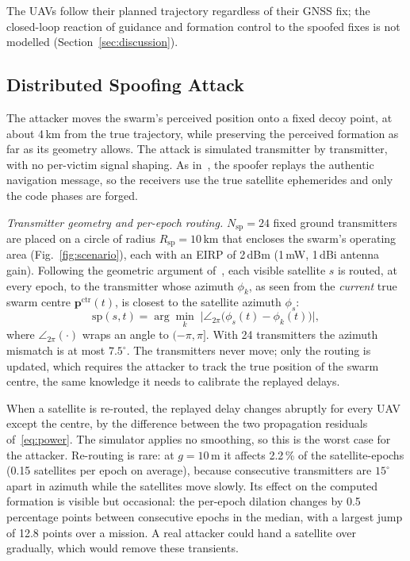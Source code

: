 \documentclass[conference]{IEEEtran}
\begin{document}
The UAVs follow their planned trajectory regardless of their GNSS fix;
the closed-loop reaction of guidance and formation control to the spoofed
fixes is not modelled (Section~\ref{sec:discussion}).

\subsection{Distributed Spoofing Attack}
\label{sec:attack}

The attacker moves the swarm's perceived position onto a fixed decoy
point, at about 4\,km from the true trajectory, while preserving the
perceived formation as far as its geometry allows. The attack is
simulated transmitter by transmitter, with no per-victim signal shaping.
As in~\cite{tibaldo2025gnsswasp}, the spoofer replays the authentic
navigation message, so the receivers use the true satellite ephemerides
and only the code phases are forged.

\emph{Transmitter geometry and per-epoch routing.}
$N_{\mathrm{sp}}=24$ fixed ground transmitters are placed on a circle of
radius $R_{\mathrm{sp}}=10$\,km that encloses the swarm's operating area
(Fig.~\ref{fig:scenario}), each with an EIRP of 2\,dBm (1\,mW, 1\,dBi
antenna gain). Following the geometric argument
of~\cite[Result~7]{tippenhauer2011requirements}, each visible satellite
$s$ is routed, at every epoch, to the transmitter whose azimuth $\phi_k$,
as seen from the \emph{current} true swarm centre
$\mathbf{p}^{\mathrm{ctr}}(t)$, is closest to the satellite azimuth
$\phi_s$:
\begin{equation}
\mathrm{sp}(s,t)=\arg\min_{k}\;
\bigl|\angle_{2\pi}\bigl(\phi_s(t)-\phi_k(t)\bigr)\bigr| ,
\label{eq:assign}
\end{equation}
where $\angle_{2\pi}(\cdot)$ wraps an angle to $(-\pi,\pi]$. With 24
transmitters the azimuth mismatch is at most $7.5^\circ$. The
transmitters never move; only the routing is updated, which requires the
attacker to track the true position of the swarm centre, the same
knowledge it needs to calibrate the replayed delays.

When a satellite is re-routed, the replayed delay changes abruptly for
every UAV except the centre, by the difference between the two
propagation residuals of~\eqref{eq:power}. The simulator applies no
smoothing, so this is the worst case for the attacker. Re-routing is
rare: at $g=10$\,m it affects 2.2\,\% of the satellite-epochs
(0.15 satellites per epoch on average), because consecutive
transmitters are $15^\circ$ apart in azimuth while the satellites move
slowly. Its effect on the computed formation is visible but
occasional: the per-epoch dilation changes by 0.5 percentage points
between consecutive epochs in the median, with a largest jump of 12.8
points over a mission. A real attacker could hand a satellite over
gradually, which would remove these transients.
\end{document}
